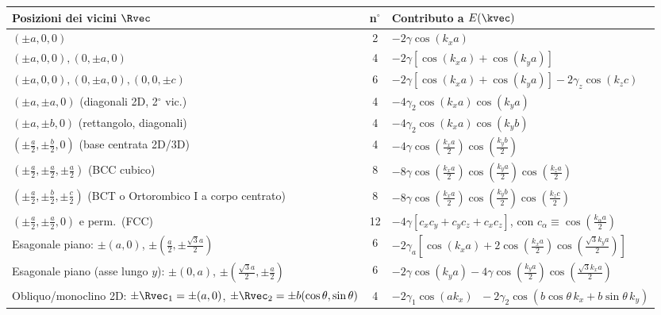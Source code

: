 \begin{center}
\renewcommand{\arraystretch}{1.7}
{\small
\begin{tabular}{p{6.2cm} c p{8.4cm}}
\toprule
\textbf{Posizioni dei vicini $\Rvec$} & \textbf{n$^\circ$} & \textbf{Contributo a $E(\kvec)$} \\
\midrule
$(\pm a,0,0)$ & 2 & $-2\gamma\cos(k_x a)$ \\
$(\pm a,0,0),(0,\pm a,0)$ & 4 & $-2\gamma\left[\cos(k_xa)+\cos(k_ya)\right]$ \\
$(\pm a,0,0),(0,\pm a,0),(0,0,\pm c)$ & 6 & $-2\gamma\left[\cos(k_xa)+\cos(k_ya)\right]-2\gamma_z\cos(k_zc)$ \\
$(\pm a,\pm a,0)$ (diagonali 2D, 2$^\circ$ vic.) & 4 & $-4\gamma_2\cos(k_xa)\cos(k_ya)$ \\
$(\pm a,\pm b,0)$ (rettangolo, diagonali) & 4 & $-4\gamma_2\cos(k_xa)\cos(k_yb)$ \\
$\left(\pm\frac a2,\pm\frac b2,0\right)$ (base centrata 2D/3D) & 4 & $-4\gamma\cos\!\left(\frac{k_xa}{2}\right)\cos\!\left(\frac{k_yb}{2}\right)$ \\
$\left(\pm\frac a2,\pm\frac a2,\pm\frac a2\right)$ (BCC cubico) & 8 & $-8\gamma\cos\!\left(\frac{k_xa}{2}\right)\cos\!\left(\frac{k_ya}{2}\right)\cos\!\left(\frac{k_za}{2}\right)$ \\
$\left(\pm\frac a2,\pm\frac b2,\pm\frac c2\right)$ \newline (BCT o Ortorombico I a corpo centrato) & 8 & $-8\gamma\cos\!\left(\frac{k_xa}{2}\right)\cos\!\left(\frac{k_yb}{2}\right)\cos\!\left(\frac{k_zc}{2}\right)$ \\
$\left(\pm\frac a2,\pm\frac a2,0\right)$ e perm.\ (FCC) & 12 & $-4\gamma\left[c_xc_y+c_yc_z+c_xc_z\right]$, \newline con $c_\alpha\equiv\cos\!\left(\frac{k_\alpha a}{2}\right)$ \\
Esagonale piano: \newline $\pm(a,0)$, $\pm\left(\frac a2,\pm\frac{\sqrt3 a}{2}\right)$ & 6 & $-2\gamma_a\left[\cos(k_xa)+2\cos\!\left(\frac{k_xa}{2}\right)\cos\!\left(\frac{\sqrt3 k_ya}{2}\right)\right]$ \\
Esagonale piano (asse lungo $y$): \newline $\pm(0,a)$, $\pm\left(\frac{\sqrt3a}{2},\pm\frac a2\right)$ & 6 & $-2\gamma\cos(k_ya)-4\gamma\cos\!\left(\frac{k_ya}{2}\right)\cos\!\left(\frac{\sqrt3k_xa}{2}\right)$ \\
Obliquo/monoclino 2D: \newline $\pm\Rvec_1=\pm(a,0)$, \newline $\pm\Rvec_2=\pm b(\cos\theta,\sin\theta)$ & 4 & $-2\gamma_1\cos(ak_x)$ \newline $\;-2\gamma_2\cos\!\left(b\cos\theta\,k_x + b\sin\theta\,k_y\right)$ \\

\end{tabular}}
\end{center}
